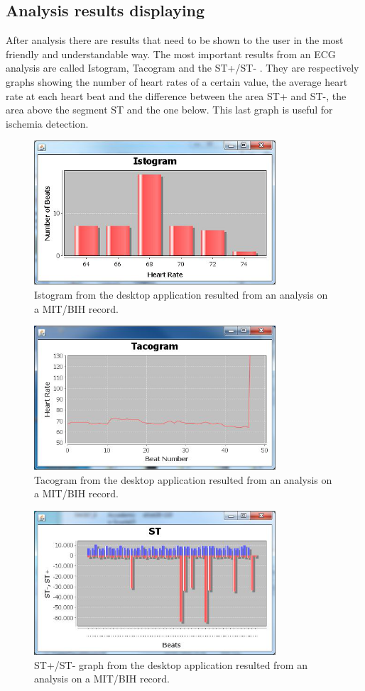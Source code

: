 \subsection{Analysis results displaying}
After analysis there are results that need to be shown to the user in the most friendly and understandable way. The most important results from an ECG analysis are called Istogram, Tacogram and the ST+/ST- . They are respectively graphs showing the number of heart rates of a certain value, the average heart rate at each heart beat and the difference between the area ST+ and ST-, the area above the segment ST and the one below. This last graph is useful for ischemia detection.\cite{ref4}
\begin{figure}[ht!]
	\centering
	\includegraphics[width=90mm]{figures/ch5/1.png}
	\caption{Istogram from the desktop application resulted from an analysis on a MIT/BIH record.}
	\label{fig5.1}
\end{figure}
\begin{figure}[ht!]
	\centering
	\includegraphics[width=90mm]{figures/ch5/2.png}
	\caption{Tacogram from the desktop application resulted from an analysis on a MIT/BIH record.}
	\label{fig5.2}
\end{figure}
\begin{figure}[ht!]
	\centering
	\includegraphics[width=90mm]{figures/ch5/3.png}
	\caption{ST+/ST- graph from the desktop application resulted from an analysis on a MIT/BIH record.}
	\label{fig5.3}
\end{figure}

